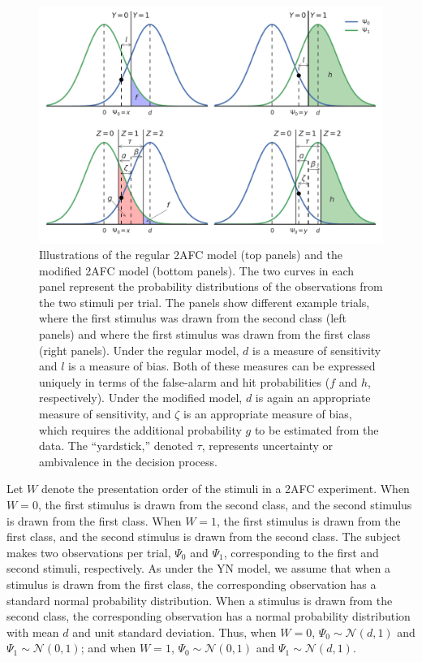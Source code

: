 \documentclass[man]{apa6}
\begin{document}
\begin{figure}
\includegraphics[width=1\textwidth]{fig2.pdf}
\caption{Illustrations of the regular 2AFC model (top panels) and the modified 2AFC model (bottom panels). The two curves in each panel represent the probability distributions of the observations from the two stimuli per trial. The panels show different example trials, where the first stimulus was drawn from the second class (left panels) and where the first stimulus was drawn from the first class (right panels). Under the regular model, $d$ is a measure of sensitivity and $l$ is a measure of bias. Both of these measures can be expressed uniquely in terms of the false-alarm and hit probabilities ($f$ and $h$, respectively). Under the modified model, $d$ is again an appropriate measure of sensitivity, and $\zeta$ is an appropriate measure of bias, which requires the additional probability $g$ to be estimated from the data. The ``yardstick,'' denoted $\tau$, represents uncertainty or ambivalence in the decision process.}
\label{fig:Figure2}
\end{figure}

Let $W$ denote the presentation order of the stimuli in a 2AFC experiment. When $W=0$, the first stimulus is drawn from the second class, and the second stimulus is drawn from the first class. When $W=1$, the first stimulus is drawn from the first class, and the second stimulus is drawn from the second class. The subject makes two observations per trial, $\Psi_0$ and $\Psi_1$, corresponding to the first and second stimuli, respectively. As under the YN model, we assume that when a stimulus is drawn from the first class, the corresponding observation has a standard normal probability distribution. When a stimulus is drawn from the second class, the corresponding observation has a normal probability distribution with mean $d$ and unit standard deviation. Thus, when $W=0$, $\Psi_0\sim\mathcal{N}\left(d,1\right)$ and $\Psi_1\sim\mathcal{N}\left(0,1\right)$; and when $W=1$, $\Psi_0\sim\mathcal{N}\left(0,1\right)$ and $\Psi_1\sim\mathcal{N}\left(d,1\right)$.
\end{document}
